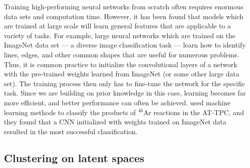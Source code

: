 \documentclass[review,sort&compress]{elsarticle}
\begin{document}


Training high-performing neural networks from scratch often requires enormous data sets and computation time. However, it has been found that models which are trained at large scale will learn general features that are applicable to a variety of tasks. For example, large neural networks which are trained on the ImageNet data set \cite{deng2009imagenet} --- a diverse image classification task --- learn how to identify lines, edges, and other common shapes that are useful for numerous problems. Thus, it is common practice to initialize the convolutional layers of a network with the pre-trained weights learned from ImageNet (or some other large data set). The training process then only has to fine-tune the network for the specific task. Since we are building on prior knowledge in this case, learning becomes far more efficient, and better performance can often be achieved. \citet{Kuchera2019} used machine learning methods to classify the products of $^{46}$Ar reactions in the AT-TPC, and they found that a CNN initialized with weights trained on ImageNet data resulted in the most successful classification.

\subsection{Clustering on latent spaces}

\end{document}
